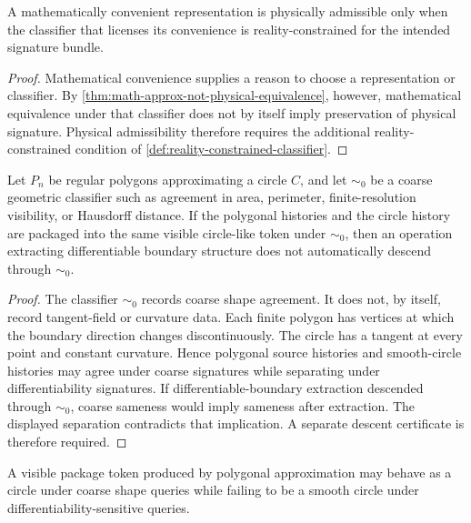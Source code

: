 \begin{corollary}
\label{cor:mathematical-convenience-not-physical-certificate}
A mathematically convenient representation is physically admissible only when the classifier that licenses its convenience is reality-constrained for the intended signature bundle.
\end{corollary}

\begin{proof}
Mathematical convenience supplies a reason to choose a representation or classifier. By \autoref{thm:math-approx-not-physical-equivalence}, however, mathematical equivalence under that classifier does not by itself imply preservation of physical signature. Physical admissibility therefore requires the additional reality-constrained condition of \autoref{def:reality-constrained-classifier}.
\end{proof}

\begin{theorem}
\label{thm:polygon-circle-no-automatic-differentiability}
Let $P_n$ be regular polygons approximating a circle $C$, and let $\sim_0$ be a coarse geometric classifier such as agreement in area, perimeter, finite-resolution visibility, or Hausdorff distance. If the polygonal histories and the circle history are packaged into the same visible circle-like token under $\sim_0$, then an operation extracting differentiable boundary structure does not automatically descend through $\sim_0$.
\end{theorem}

\begin{proof}
The classifier $\sim_0$ records coarse shape agreement. It does not, by itself, record tangent-field or curvature data. Each finite polygon has vertices at which the boundary direction changes discontinuously. The circle has a tangent at every point and constant curvature. Hence polygonal source histories and smooth-circle histories may agree under coarse signatures while separating under differentiability signatures. If differentiable-boundary extraction descended through $\sim_0$, coarse sameness would imply sameness after extraction. The displayed separation contradicts that implication. A separate descent certificate is therefore required.
\end{proof}

\begin{corollary}
\label{cor:circle-like-token-classifier-relative}
A visible package token produced by polygonal approximation may behave as a circle under coarse shape queries while failing to be a smooth circle under differentiability-sensitive queries.
\end{corollary}

